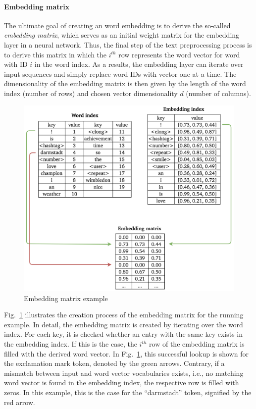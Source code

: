 \paragraph{Embedding matrix}
\label{sub:embedding_matrix}

The ultimate goal of creating an word embedding is to derive the so-called
\textit{embedding matrix}, which serves as an initial weight matrix for the
embedding layer in a neural network.
Thus, the final step of the text preprocessing process is to derive this
matrix in which the $i^{th}$ row represents the word vector for word with ID $i$
in the word index.
As a results, the embedding layer can iterate over input sequences and simply
replace word IDs with vector one at a time.
The dimensionality of the embedding matrix is then given by the length of the
word index (number of rows) and chosen vector dimensionality $d$ (number of columns).

\begin{figure}[h]
  \includegraphics[width=\textwidth]{img/text_preprocessing_5}
  \caption{Embedding matrix example}
\label{fig:embedding_matrix}
\end{figure}

Fig.~\ref{fig:embedding_matrix} illustrates the creation process of the embedding
matrix for the running example.
In detail, the embedding matrix is created by iterating over the word index.
For each key, it is checked whether an entry with the same key exists in the
embedding index.
If this is the case, the $i^{th}$ row of the embedding matrix is filled with
the derived word vector.
In Fig.~\ref{fig:embedding_matrix}, this successful lookup is shown for the
exclamation mark token, denoted by the green arrows.
Contrary, if a mismatch between input and word vector vocabularies exists, i.e.,
no matching word vector is found in the embedding index, the respective row
is filled with zeros.
In this example, this is the case for the ``darmstadt'' token, signified by the
red arrow.

